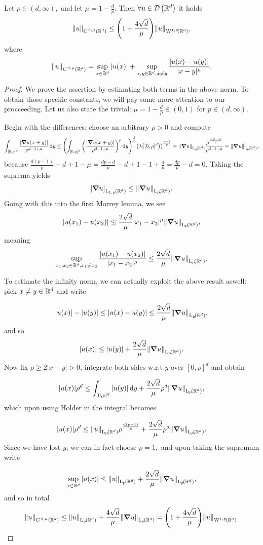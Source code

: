 \documentclass{article}
\begin{document}
\begin{lemma}
	Let $p \in (d, \infty),$ and let $\mu = 1 - \frac{d}{p}.$ Then $\forall u \in \mathcal{D}\!\,\left({\mathbb R}^{d} \right)$ it holds
	\[
		\norm{u}_{\CklSet{0}{\mu}{\R^{d}}} \leq \qty(1+ \frac{4 \sqrt{d}}{\mu})\norm{u}_{\WkpSet[1][p]{\R^{d}}},
	\]
	where
	\[
		\norm{u}_{\text{C}^{\!\, \,0,\mu}\!\,\left({\mathbb R}^{d} \right)} = \sup_{x \in {\mathbb R}^{d}}|u(x)| + \sup_{x,y \in {\mathbb R}^{d}, x \neq y}\frac{|u(x)-u(y)|}{|x-y|^{\mu}}.
	\]
\end{lemma}
\begin{proof}
	We prove the assertion by estimating both terms in the above norm. To obtain those specific constants, we will pay some more attention to our procceeding. Let us also state the trivial: $\mu = 1 - \frac{d}{p} \in (0,1)$ for $p \in (d, \infty).$

	Begin with the differences: choose an arbitrary $\rho>0$ and compute
	\[
		\int_{[0,\rho]^d}\frac{|\grad u(x+y)|}{\rho^{d-1 + \mu}}\dd{y} \leq \qty(\int_{[0,\rho]^d}\qty(\frac{|\grad u(x+y)| }{\rho^{d-1+\mu}})^{p}\dd{y})^{\frac{1}{p}}\qty(\lambda\qty([0,\rho]^d))^{\frac{p-1}{p}} = \norm{\grad u}_{\LpSet[p]{\R^{d}}} \frac{\rho^{\frac{d(p-1)}{p}}}{\rho^{d-1+\mu}} = \norm{\grad u}_{\LpSet{\R^{d}}},
	\]
	because $\frac{d(p-1)}{p}-d+1-\mu = \frac{dp - d}{p} -d +1 -1 + \frac{d}{p} = \frac{dp}{p}-d = 0.$ Taking the suprema yields
	\[
		\qty[\grad u]_{\LpSet[1,\mu]{\R^{d}}} \leq \norm{\grad u}_{\LpSet{\R^{d}}}.
	\]
	Going with this into the first Morrey lemma, we see
	\[
		|u(x_1) - u(x_2)| \leq \frac{2 \sqrt{d}}{\mu} |x_1 - x_2|^{\mu}\norm{\grad u}_{\LpSet{\R^{d}}},
	\]
	meaning
	\[
		\sup_{x_1, x_2 \in \R^{d}, x_1 \neq x_2}\frac{|u(x_1) - u(x_2)|}{|x_1-x_2|^{\mu}} \leq \frac{2 \sqrt{d}}{\mu}\norm{\grad u}_{\LpSet{\R^{d}}}.
	\]

	To estimate the infinity norm, we can actually exploit the above result aswell: pick $x \neq y \in {\mathbb R}^{d}$ and write 

	\[
		|u(x)| - |u(y)| \leq |u(x) - u(y)| \leq \frac{2 \sqrt{d}}{\mu} \norm{\grad u}_{\LpSet{\R^{d}}},
	\]
	and so
	\[
		|u(x)| \leq |u(y)| + \frac{2 \sqrt{d}}{\mu} \norm{\grad u}_{\LpSet{\R^{d}}}.
	\]
	Now fix $\rho \geq 2 |x-y| > 0$, integrate both sides w.r.t $y$ over $[0,\rho]^d$ and obtain

	\[
		|u(x)| \rho^d \leq \int_{[0,\rho]^d}|u(y)|\dd{y} + \frac{2 \sqrt{d}}{\mu}\rho^d \norm{\grad u}_{\LpSet{\R^{d}}},
	\]
	which upon using Holder in the integral becomes

	\[
		|u(x)| \rho^d \leq \norm{u}_{\LpSet{\R^{d}}} \rho^{\frac{d\qty(p-1)}{p}} + \frac{2 \sqrt{d}}{\mu}\rho^{d} \norm{\grad u}_{\LpSet[p]{\R^{d}}}.
	\]
	Since we have lost $y$, we can in fact choose $\rho = 1,$ and upon taking the supremum write

	\[
		\sup_{x\in \R^{d}} |u(x)| \leq \norm{u}_{\LpSet{\R^{d}}} + \frac{2 \sqrt{d}}{\mu} \norm{\grad u}_{\LpSet[p]{\R^{d}}},
	\]
	and so in total
	\[
		\norm{u}_{\CklSet{0}{\mu}{\R^{d}}} \leq \norm{u}_{\LpSet{\R^{d}}} + \frac{4 \sqrt{d}}{\mu}\norm{\grad u}_{\LpSet{\R^{d}}} = \qty(1+\frac{4 \sqrt{d}}{\mu})\norm{u}_{\WkpSet[1][p]{\R^{d}}}.
	\]
\end{proof}
\end{document}
